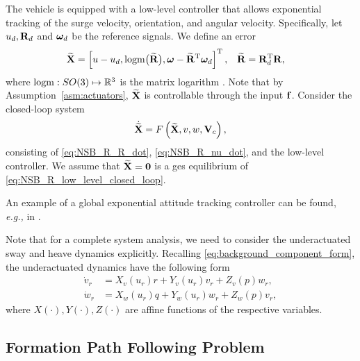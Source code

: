 \begin{asm}
    \label{ass5}
    The vehicle is equipped with a low-level controller that allows exponential tracking of the surge velocity, orientation, and angular velocity.
    Specifically, let $u_d, \mathbf{R}_d$ and $\bm{\omega}_d$ be the reference signals.
    We define an error 
    \begin{align}
        \widetilde{\mathbf{X}} &= \left[u - u_d, {\rm logm}\bigl(\widetilde{\mathbf{R}}\bigr), \bm{\omega} - \widetilde{\mathbf{R}}^{\mathrm{T}}\bm{\omega}_d\right]^{\mathrm{T}}, &
        \widetilde{\mathbf{R}} &= \mathbf{R}_d^{\mathrm{T}}\mathbf{R}, \label{eq:NSB_R_low_level_error}
    \end{align}
    where ${\rm logm} : SO(3) \mapsto \mathbb{R}^3$ is the matrix logarithm \cite{iserles_lie_2000}.
    Note that by Assumption~\ref{asm:actuators}, $\widetilde{\mathbf{X}}$ is controllable through the input $\mathbf{f}$.
    Consider the closed-loop system 
    \begin{equation}
        \dot{\widetilde{\mathbf{X}}} = F \left( \widetilde{\mathbf{X}}, v, w, \mathbf{V}_c \right), \label{eq:NSB_R_low_level_closed_loop}
    \end{equation}
    consisting of \eqref{eq:NSB_R_R_dot}, \eqref{eq:NSB_R_nu_dot}, and the low-level controller.
    We assume that $\widetilde{\mathbf{X}} = \mathbf{0}$ is a \acrfull{ges} equilibrium of \eqref{eq:NSB_R_low_level_closed_loop}.
\end{asm}

An example of a global exponential attitude tracking controller can be found, \emph{e.g.,} in \cite{lee_global_2015}.

Note that for a complete system analysis, we need to consider the underactuated sway and heave dynamics explicitly. 
Recalling \eqref{eq:background_component_form}, the underactuated dynamics have the following form 
\begin{subequations}
    \begin{align}
        \dot{v}_r &= X_v(u_r)r + Y_v(u_r)v_r + Z_v(p)w_r, \\
        \dot{w}_r &= X_w(u_r)q + Y_w(u_r)w_r + Z_w(p)v_r,
        \label{eq:NSB_R_underactuated_dynamics}
    \end{align}
\end{subequations}
where $X(\cdot), Y(\cdot), Z(\cdot)$ are affine functions of the respective variables.

\subsection{Formation Path Following Problem}
\label{sec:NSB_R_objectives}

